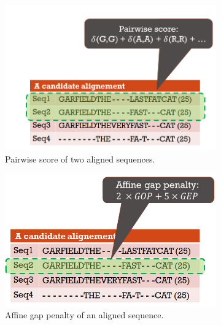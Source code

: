 \begin{itemize}
	
	\begin{figure}[!htbp]
		\begin{adjustwidth}{-0.2cm}{}
			\centering
			\begin{subfigure}[b]{0.5\columnwidth}
				\includegraphics[width=\columnwidth]{Figure/pairwise}
				\caption{Pairwise score of two aligned sequences.}
				\label{fig:pairwise}
			\end{subfigure}	
			\begin{subfigure}[b]{0.5\columnwidth}
				\includegraphics[width=\columnwidth]{Figure/agp}
				\caption{Affine gap penalty of an aligned sequence.}
				\label{fig:agp}
			\end{subfigure}
			\begin{subfigure}[b]{0.5\columnwidth}

\end{subfigure}
\end{adjustwidth}
\end{figure}
\end{itemize}
